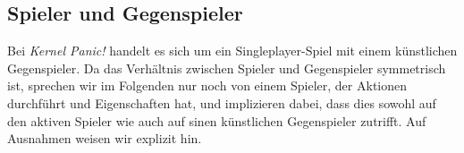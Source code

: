 \subsection{Spieler und Gegenspieler}

Bei \emph{Kernel Panic!} handelt es sich um ein Singleplayer-Spiel mit einem
künstlichen Gegenspieler. Da das Verhältnis zwischen Spieler und Gegenspieler
symmetrisch ist, sprechen wir im Folgenden nur noch von einem Spieler, der
Aktionen durchführt und Eigenschaften hat, und implizieren dabei, dass dies
sowohl auf den aktiven Spieler wie auch auf sinen künstlichen Gegenspieler
zutrifft. Auf Ausnahmen weisen wir explizit hin.
